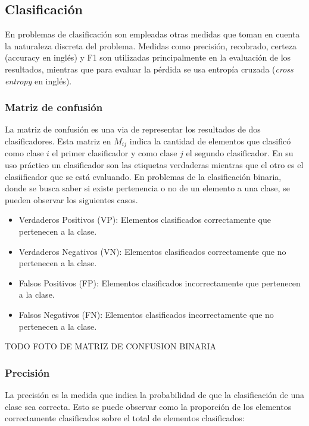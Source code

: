 \subsection{Clasificación}

En problemas de clasificación son empleadas otras medidas que toman en cuenta la naturaleza discreta del problema. 
Medidas como precisión, recobrado, certeza (accuracy en inglés) y F1 son utilizadas principalmente en la 
evaluación de los resultados, mientras que para evaluar la pérdida se usa entropía cruzada 
(\emph{cross entropy} en inglés).

\subsubsection{Matriz de confusión}

La matriz de confusión es una via de representar los resultados de dos clasificadores. Esta matriz en $M_{ij}$ 
indica la cantidad de elementos que clasificó como clase $i$ el primer clasificador y
como clase $j$ el segundo clasificador. En su uso práctico
un clasificador son las etiquetas verdaderas mientras que el otro es el clasiificador que se está evaluando. 
En problemas de la clasificación binaria, donde se busca saber si existe pertenencia o no de un elemento a una clase,
se pueden observar los siguientes casos.

\begin{itemize}
	\item Verdaderos Positivos (VP): Elementos clasificados correctamente que pertenecen a la clase.
	\item Verdaderos Negativos (VN): Elementos clasificados correctamente que no pertenecen a la clase.
	\item Falsos Positivos (FP): Elementos clasificados incorrectamente que pertenecen a la clase.
	\item Falsos Negativos (FN): Elementos clasificados incorrectamente que no pertenecen a la clase.
\end{itemize}

TODO FOTO DE MATRIZ DE CONFUSION BINARIA

\subsubsection{Precisión}

La precisión es la medida que indica la probabilidad de que la clasificación de una clase sea correcta. Esto 
se puede observar como la proporción de los elementos correctamente clasificados sobre el total de 
elementos clasificados:

